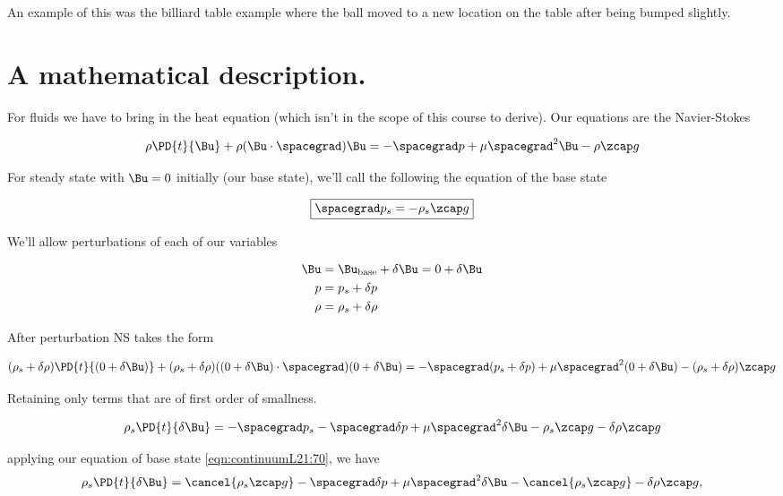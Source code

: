 An example of this was the billiard table example where the ball moved to a new location on the table after being bumped slightly.

\section{A mathematical description.}

For fluids we have to bring in the heat equation (which isn't in the scope of this course to derive).  Our equations are the Navier-Stokes

\begin{equation}\label{eqn:continuumL21:50}
\rho \PD{t}{\Bu} + \rho (\Bu \cdot \spacegrad) \Bu = - \spacegrad p + \mu \spacegrad^2 \Bu - \rho \zcap g
\end{equation}

For steady state with $\Bu = 0$ initially (our base state), we'll call the following the equation of the base state

\begin{equation}\label{eqn:continuumL21:70}
\boxed{
\spacegrad p_s = -\rho_s \zcap g
}
\end{equation}

We'll allow perturbations of each of our variables

\begin{align*}
\Bu &= \Bu_\text{base} + \delta \Bu = 0 + \delta \Bu \\
p &= p_s + \delta p \\
\rho &= \rho_s + \delta \rho
\end{align*}

After perturbation NS takes the form

\begin{equation}\label{eqn:continuumL21:90}
(\rho_s + \delta \rho )\PD{t}{(0 + \delta \Bu)} + (\rho_s + \delta \rho) ((0 + \delta \Bu) \cdot \spacegrad) (0 + \delta \Bu) = - \spacegrad (p_s + \delta p) + \mu \spacegrad^2 (0 + \delta \Bu) - (\rho_s + \delta \rho) \zcap g
\end{equation}

Retaining only terms that are of first order of smallness.

\begin{equation}\label{eqn:continuumL21:110}
\rho_s \PD{t}{\delta \Bu} = - \spacegrad p_s - \spacegrad \delta p + \mu \spacegrad^2 \delta \Bu - \rho_s \zcap g - \delta \rho \zcap g
\end{equation}

applying our equation of base state \ref{eqn:continuumL21:70}, we have
\begin{equation}\label{eqn:continuumL21:110b}
\rho_s \PD{t}{\delta \Bu} = \cancel{\rho_s \zcap g} - \spacegrad \delta p + \mu \spacegrad^2 \delta \Bu - \cancel{\rho_s \zcap g} - \delta \rho \zcap g,
\end{equation}

